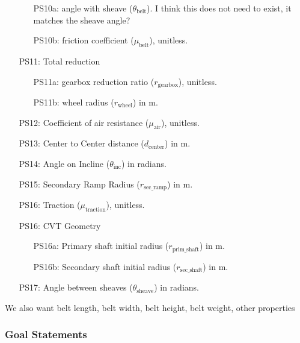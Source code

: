 \documentclass[12pt]{article}
\begin{document}
\begin{itemize}
\begin{itemize}
  \item [PS10a:] angle with sheave ($\theta_{\text{belt}}$). I think this does not need to exist, it matches the sheave angle?
  \item [PS10b:] friction coefficient ($\mu_{\text{belt}}$), unitless.
\end{itemize}

\item[PS11:] Total reduction

\begin{itemize}
  \item [PS11a:] gearbox reduction ratio ($r_{\text{gearbox}}$), unitless.
  \item [PS11b:] wheel radius ($r_{\text{wheel}}$) in m.
\end{itemize}

\item[PS12:] Coefficient of air resistance ($\mu_{\text{air}}$), unitless.

\item[PS13:] Center to Center distance ($d_{\text{center}}$) in m.

\item[PS14:] Angle on Incline ($\theta_{\text{inc}}$) in radians.

\item[PS15:] Secondary Ramp Radius ($r_{\text{sec\_ramp}}$) in m.

\item[PS16:] Traction ($\mu_{\text{traction}}$), unitless.

\item[PS16:] CVT Geometry
\item[] \begin{itemize}
  \item [PS16a:] Primary shaft initial radius ($r_{\text{prim\_shaft}}$) in m.
  \item [PS16b:] Secondary shaft initial radius ($r_{\text{sec\_shaft}}$) in m.
\end{itemize}

\item[PS17:] Angle between sheaves ($\theta_{\text{sheave}}$) in radians. 

\end{itemize}
We also want belt length, belt width, belt height, belt weight, other properties

\subsubsection{Goal Statements}
\end{document}
